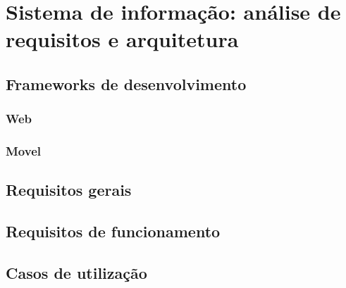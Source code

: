 \chapter{Sistema de informação: análise de requisitos e arquitetura}


\section{Frameworks de desenvolvimento}

\subsection{Web}

\subsection{Movel}


\section{Requisitos gerais}



\section{Requisitos de funcionamento}


\section{Casos de utilização}